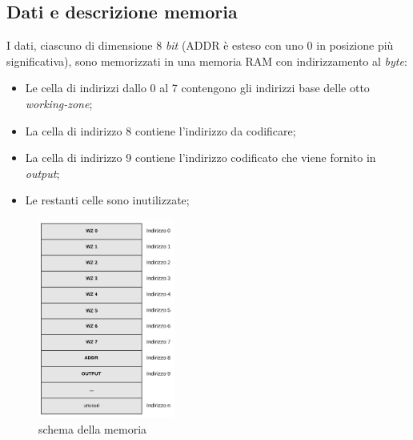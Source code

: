 \documentclass{article}
\begin{document}
\subsection{Dati e descrizione memoria}
I dati, ciascuno di dimensione 8 \textit{bit} (ADDR è esteso con uno 0 in posizione più significativa), sono memorizzati in una memoria RAM con indirizzamento al \textit{byte}:
\begin{itemize}
\item Le cella di indirizzi dallo 0 al 7 contengono gli indirizzi base delle otto \textit{working-zone};
\item La cella di indirizzo 8 contiene l'indirizzo da codificare;
\item La cella di indirizzo 9 contiene l'indirizzo codificato che viene fornito in \textit{output};
\item Le restanti celle sono inutilizzate;
\end{itemize}
\begin{figure}[h]
    \centering
    \includegraphics[width=0.4\textwidth]{memoria}
    \caption{schema della memoria}
\end{figure}
\pagebreak
\end{document}
